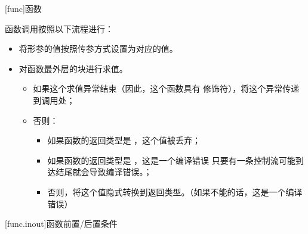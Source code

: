
[func]{函数}

\pnum
函数调用按照以下流程进行：

\begin{itemize}
    \item 将形参的值按照传参方式设置为对应的值。
    \item 对函数最外层的块进行求值。
    \begin{itemize}
        \item 如果这个求值异常结束（因此，这个函数具有  修饰符），将这个异常传递到调用处；
        \item 否则：
        \begin{itemize}
            \item 如果函数的返回类型是 ，这个值被丢弃；
            \item 如果函数的返回类型是 ，这是一个编译错误 \enternote 只要有一条控制流可能到达结尾就会导致编译错误。\exitnote；
            \item 否则，将这个值隐式转换到返回类型。（如果不能的话，这是一个编译错误）
        \end{itemize}
    \end{itemize}
\end{itemize}

[func.inout]{函数前置/后置条件}
